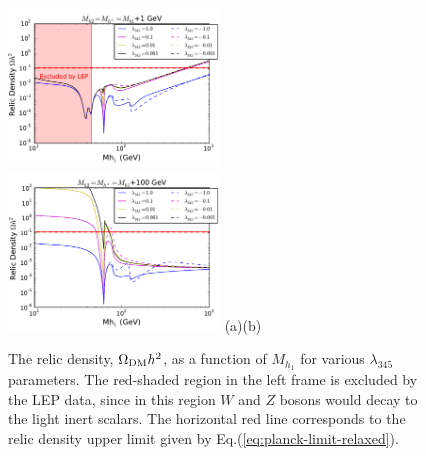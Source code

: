 \documentclass[12pt,a4paper]{article}
\begin{document}
\begin{figure}[htb]
\centering
{\includegraphics[width=0.5\textwidth]{Omega_Mh1_new.pdf}}%
{\includegraphics[width=0.5\textwidth]{Omega_Mh1_mh+100_new.pdf}}%
\vskip -0.5cm\hspace*{-3cm}(a)\hspace*{0.48\textwidth}(b)
\caption{The relic density, $\Omega_{\rm DM} h^2$,   as a function of $M_{h_1}$
for various $\lambda_{345}$ parameters. The red-shaded region in the left frame is excluded by the LEP data, 
since in this region $W$ and $Z$ bosons would decay to the light inert scalars. 
The horizontal red line corresponds to the relic density upper limit given by Eq.(\ref{eq:planck-limit-relaxed}).}
\label{fig:1d-mh1-Omega}
\end{figure}
%
 
\end{document}
